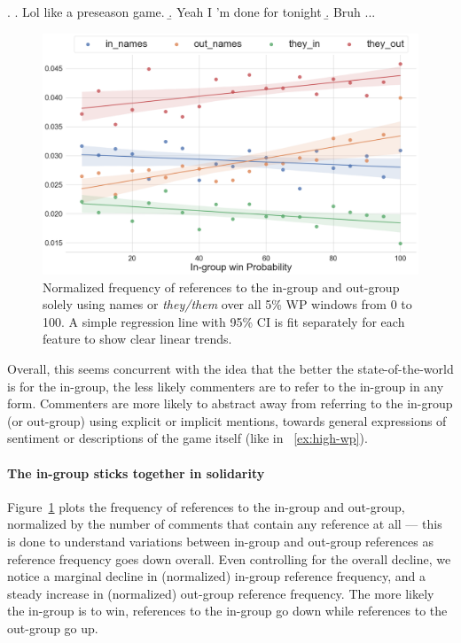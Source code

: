 \ex.\label{ex:low-wp} \a. Lol like a preseason game.
     \b. Yeah I ’m done for tonight
     \b. Bruh ...

\begin{figure}[t]
          \centering
          \includegraphics[width=\linewidth]{figures/trends-3.png}
          \caption{Normalized frequency of references to the in-group and out-group solely using names or \emph{they/them} over all 5\% WP windows from 0 to 100. A simple regression line with 95\% CI is fit separately for each feature to show clear linear trends.}
          \label{fig:trends-2}
      \end{figure}

Overall, this seems concurrent with the idea that the better the state-of-the-world is for the in-group, the less likely commenters are to refer to the in-group in any form. Commenters are more likely to abstract away from referring to the in-group (or out-group) using explicit or implicit mentions, towards general expressions of sentiment or descriptions of the game itself (like in ~\ref{ex:high-wp}).
    
\paragraph{The in-group sticks together in solidarity} Figure~\ref{fig:trends-2} plots the frequency of references to the in-group and out-group, normalized by the number of comments that contain any reference at all --- this is done to understand variations between in-group and out-group references as reference frequency goes down overall. Even controlling for the overall decline, we notice a marginal decline in (normalized) in-group reference frequency, and a steady increase in (normalized) out-group reference frequency. The more likely the in-group is to win, references to the in-group go down while references to the out-group go up.


